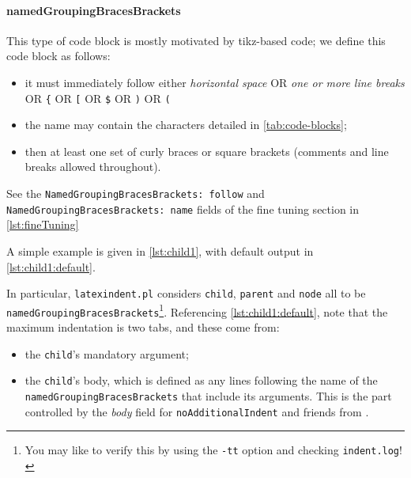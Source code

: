 \documentclass[10pt]{article}
\begin{document}
 \paragraph{namedGroupingBracesBrackets} This type of code block is mostly motivated by
  tikz-based code; we define this code block as follows:
  \begin{itemize}
   \item it must immediately follow either \emph{horizontal space} OR \emph{one or more
         line breaks} OR \lstinline!{! OR \lstinline![! OR \lstinline!$! OR \lstinline!)!
         OR \lstinline!(!
   \item the name may contain the characters detailed in \vref{tab:code-blocks};
   \item then at least one set of curly braces or square brackets (comments and line
         breaks allowed throughout).
  \end{itemize}
  See the \texttt{NamedGroupingBracesBrackets: follow} and
  \texttt{NamedGroupingBracesBrackets: name} fields of the fine tuning section in
  \vref{lst:fineTuning} %

  \begin{example}
  A simple example is given in \cref{lst:child1}, with default output in
  \cref{lst:child1:default}.

  \begin{cmhtcbraster}
  \end{cmhtcbraster}

  In particular, \texttt{latexindent.pl} considers \texttt{child}, \texttt{parent} and
  \texttt{node} all to be \texttt{namedGroupingBracesBrackets}\footnote{ You may like to
  verify this by using the \texttt{-tt} option and checking \texttt{indent.log}! }.
  Referencing \cref{lst:child1:default}, note that the maximum indentation is two tabs,
  and these come from:
  \begin{itemize}
   \item the \lstinline!child!'s mandatory argument;
   \item the \lstinline!child!'s body, which is defined as any lines following the name
         of the \texttt{namedGroupingBracesBrackets} that include its arguments. This is
         the part controlled by the \emph{body} field for \texttt{noAdditionalIndent} and
         friends from .
  \end{itemize}
  \end{example}
\end{document}
